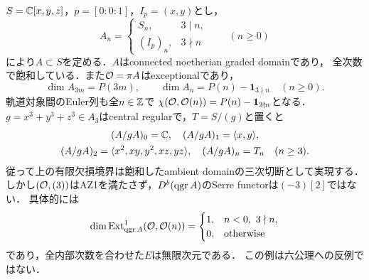 \documentclass[11pt,a4paper]{ltjsarticle}
\begin{document}
\begin{example}[一点での剰余条件とSerre双対性の失敗]\label{ex:cubic-defect-pinched-ambient}
$S=\mathbb C[x,y,z]$，$p=[0:0:1]$，$I_p=(x,y)$とし，
\[
 A_n=\begin{cases}
 S_n,&3\mid n,\\
 (I_p)_n,&3\nmid n
 \end{cases}
 \qquad(n\geq0)
\]
により$A\subset S$を定める．$A$はconnected noetherian graded domainであり，
全次数で飽和している．また$\mathcal O=\pi A$はexceptionalであり，
\[
 \dim A_{3m}=P(3m),\qquad
 \dim A_n=P(n)-\mathbf1_{3\nmid n}\quad(n\geq0).
\]
軌道対象間のEuler列も全$n\in\mathbb Z$で
$\chi(\mathcal O,\mathcal O(n))=P(n)-\mathbf1_{3\nmid n}$となる．
$g=x^3+y^3+z^3\in A_3$はcentral regularで，$T=S/(g)$と置くと
\[
 \begin{gathered}
 (A/gA)_0=\mathbb C,\quad
 (A/gA)_1=\langle x,y\rangle,\\
 (A/gA)_2=\langle x^2,xy,y^2,xz,yz\rangle,\quad
 (A/gA)_n=T_n\quad(n\geq3).
 \end{gathered}
\]
従って上の有限欠損境界は飽和したambient domainの三次切断として実現する．
しかし$(\mathcal O,(3))$はAZ1を満たさず，$D^b(\operatorname{qgr} A)$のSerre functorは$(-3)[2]$ではない．
具体的には
\[
 \dim\operatorname{Ext}^1_{\operatorname{qgr} A}(\mathcal O,\mathcal O(n))
 =\begin{cases}1,&n<0,\ 3\nmid n,\\0,&\text{otherwise}\end{cases}
\]
であり，全内部次数を合わせた$E$は無限次元である．
この例は六公理への反例ではない．
\end{example}
\end{document}
